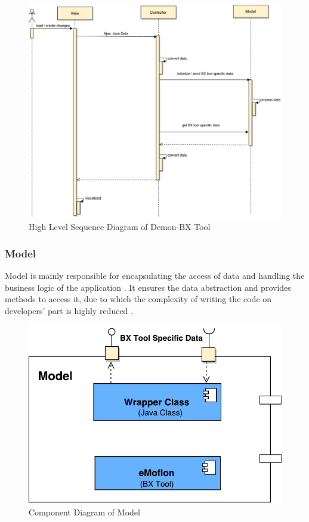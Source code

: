 \begin{figure}
	\includegraphics[width=1\textwidth]{figures/Sequence_Diagram-HighLevel}
	\caption{High Level Sequence Diagram of Demon-BX Tool}
	\label{fig:Sequence_Diagram-HighLevel}
\end{figure}

\subsubsection{Model}\label{subsubsec:design_model}
Model is mainly responsible for encapsulating the access of data and handling the business logic of the application \cite{designpattern-headfirst} \cite{mvc-arch}. It ensures the data abstraction and provides methods to access it, due to which the complexity of writing the code on developers' part is highly reduced \cite{mdd-webwithmvc}.

\begin{figure}
	\includegraphics[width=1\textwidth]{figures/Component_Diagram-Model}
	\caption{Component Diagram of Model}
	\label{fig:Component_Diagram-Model}
\end{figure}

